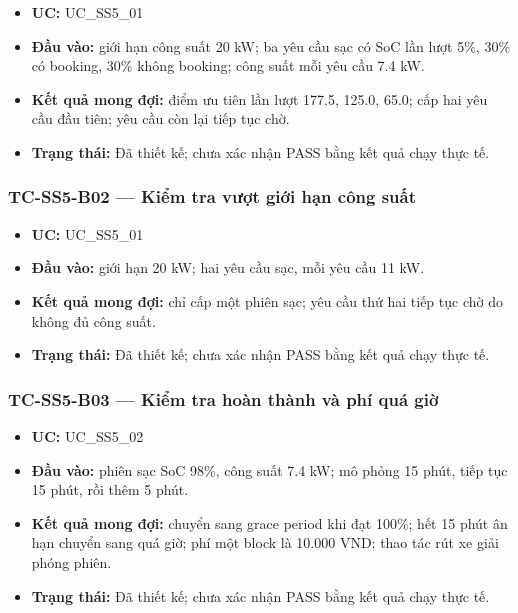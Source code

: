 \documentclass[11pt,a4paper]{article}
\providecommand{\tightlist}{%
  \setlength{\itemsep}{0pt}\setlength{\parskip}{0pt}}
\begin{document}
\begin{itemize}
\tightlist
\item
  \textbf{UC:} UC\_SS5\_01
\item
  \textbf{Đầu vào:} giới hạn công suất 20 kW; ba yêu cầu sạc có SoC lần
  lượt 5\%, 30\% có booking, 30\% không booking; công suất mỗi yêu cầu
  7.4 kW.
\item
  \textbf{Kết quả mong đợi:} điểm ưu tiên lần lượt 177.5, 125.0, 65.0;
  cấp hai yêu cầu đầu tiên; yêu cầu còn lại tiếp tục chờ.
\item
  \textbf{Trạng thái:} Đã thiết kế; chưa xác nhận PASS bằng kết quả chạy
  thực tế.
\end{itemize}

\hypertarget{tc-ss5-b02-kiux1ec3m-tra-vux1b0ux1ee3t-giux1edbi-hux1ea1n-cuxf4ng-suux1ea5t}{%
\subsubsection{TC-SS5-B02 --- Kiểm tra vượt giới hạn công
suất}\label{tc-ss5-b02-kiux1ec3m-tra-vux1b0ux1ee3t-giux1edbi-hux1ea1n-cuxf4ng-suux1ea5t}}

\begin{itemize}
\tightlist
\item
  \textbf{UC:} UC\_SS5\_01
\item
  \textbf{Đầu vào:} giới hạn 20 kW; hai yêu cầu sạc, mỗi yêu cầu 11 kW.
\item
  \textbf{Kết quả mong đợi:} chỉ cấp một phiên sạc; yêu cầu thứ hai tiếp
  tục chờ do không đủ công suất.
\item
  \textbf{Trạng thái:} Đã thiết kế; chưa xác nhận PASS bằng kết quả chạy
  thực tế.
\end{itemize}

\hypertarget{tc-ss5-b03-kiux1ec3m-tra-houxe0n-thuxe0nh-vuxe0-phuxed-quuxe1-giux1edd}{%
\subsubsection{TC-SS5-B03 --- Kiểm tra hoàn thành và phí quá
giờ}\label{tc-ss5-b03-kiux1ec3m-tra-houxe0n-thuxe0nh-vuxe0-phuxed-quuxe1-giux1edd}}

\begin{itemize}
\tightlist
\item
  \textbf{UC:} UC\_SS5\_02
\item
  \textbf{Đầu vào:} phiên sạc SoC 98\%, công suất 7.4 kW; mô phỏng 15
  phút, tiếp tục 15 phút, rồi thêm 5 phút.
\item
  \textbf{Kết quả mong đợi:} chuyển sang grace period khi đạt 100\%; hết
  15 phút ân hạn chuyển sang quá giờ; phí một block là 10.000 VND; thao
  tác rút xe giải phóng phiên.
\item
  \textbf{Trạng thái:} Đã thiết kế; chưa xác nhận PASS bằng kết quả chạy
  thực tế.
\end{itemize}
\end{document}
